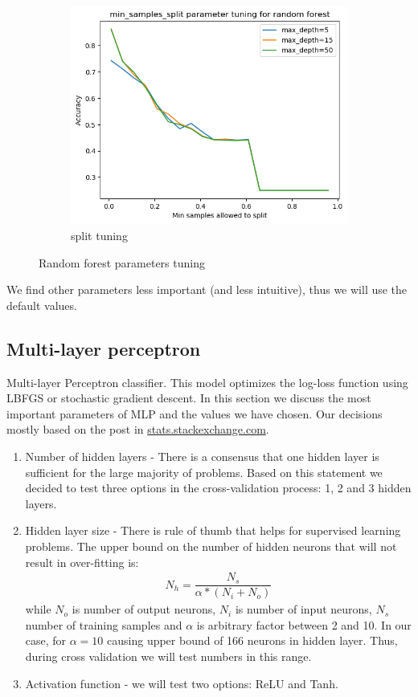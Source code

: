 \documentclass[12pt]{article}
\begin{document}
\begin{figure}[h]
\begin{subfigure}{0.3\textwidth}
  \includegraphics[width=1\linewidth]{Cross_valid_plots/s_hyper_forest_fig}
  \caption{split tuning}
  \label{fig:sub2}
\end{subfigure}
\caption{Random forest parameters tuning}
\label{fig:test}
\end{figure}

We find other parameters less important (and less intuitive), thus we will use the default values.

\newpage
\subsection{Multi-layer perceptron}
Multi-layer Perceptron classifier. This model optimizes the log-loss function using LBFGS or stochastic gradient descent. In this section we discuss the most important parameters of MLP and the values we have chosen. Our decisions mostly based on the post in \href{https://stats.stackexchange.com/questions/181/how-to-choose-the-number-of-hidden-layers-and-nodes-in-a-feedforward-neural-netw}{stats.stackexchange.com}.
\begin{enumerate}
	\item Number of hidden layers - There is a consensus that one hidden layer is sufficient for the large majority of problems. Based on this statement we decided to test three options in the cross-validation process: 1, 2 and 3 hidden layers.
	\item Hidden layer size - There is rule of thumb that helps for supervised learning problems. The upper bound on the number of hidden neurons that will not result in over-fitting is:
\begin{gather*}
N_h = \dfrac{N_s}{\alpha * (N_i + N_o)}
\end{gather*}
while $N_o$ is number of output neurons, $N_i$ is number of input neurons, $N_s$ number of training samples and $\alpha$ is arbitrary factor between 2 and 10. In our case, for $\alpha = 10$ causing upper bound of 166 neurons in hidden layer. Thus, during cross validation we will test numbers in this range.
	\item Activation function - we will test two options: ReLU and Tanh.
\end{enumerate}
\end{document}
